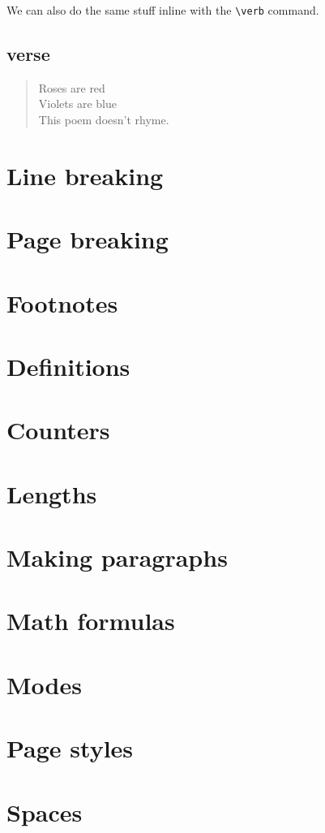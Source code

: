 \documentclass[11pt]{article}
\begin{document}
We can also do the same stuff inline with the \verb|\verb| command.

\subsection{verse}
\begin{verse}
    Roses are red\\
    Violets are blue\\
    This poem doesn't rhyme.
\end{verse}


\section{Line breaking}%
\section{Page breaking}%
\section{Footnotes}%
\section{Definitions}%
\section{Counters}%
\section{Lengths}%
\section{Making paragraphs}%
\section{Math formulas}%
\section{Modes}%
\section{Page styles}%
\section{Spaces}%
\end{document}
